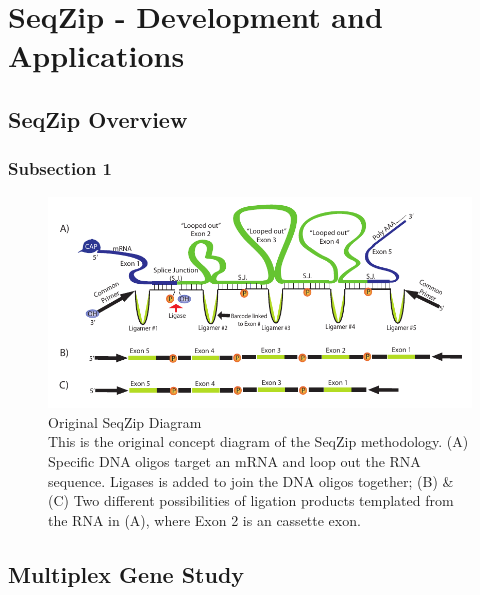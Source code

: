 \chapter{SeqZip - Development and Applications} %
\label{Chapter2} 
\section{SeqZip Overview}\label{sec: SeqZip Overview}
\subsection{Subsection 1}\label{sec: SeqZip Overview}


\begin{figure}[htbp]
	\centering 
	\includegraphics{Figures/Chapter2/OriginalSeqZipDiagram.pdf}
	\caption[Original SeqZip Diagram]
	{
		Original SeqZip Diagram\\
		This is the original concept diagram of the SeqZip methodology. (A) Specific DNA oligos target an mRNA and loop out the RNA sequence. Ligases is added to join the DNA oligos together; (B) \& (C) Two different possibilities of ligation products templated from the RNA in (A), where Exon 2 is an cassette exon.
	}
	\label{fig:Original SeqZip Diagram}
\end{figure}

\section{Multiplex Gene Study}

